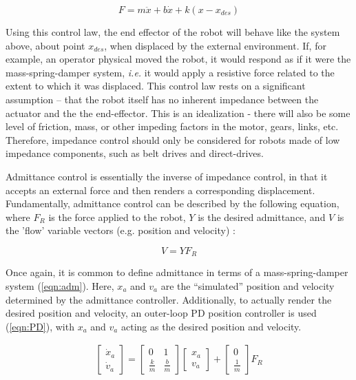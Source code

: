 \documentclass[12pt]{report}
\begin{document}
\begin{equation}
	F = m\ddot{x} + b\dot{x} + k(x - x_{des})
\end{equation} 

Using this control law, the end effector of the robot will behave like the system above, about point $x_{des}$, when displaced by the external environment. If, for example, an operator physical moved the robot, it would respond as if it were the mass-spring-damper system, \textit{i.e.} it would apply a resistive force related to the extent to which it was displaced. 
	This control law rests on a significant assumption -- that the robot itself has no inherent impedance between the actuator and the the end-effector. This is an idealization - there will also be some level of friction, mass, or other impeding factors in the motor, gears, links, etc. Therefore, impedance control should only be considered for robots made of low impedance components, such as belt drives and direct-drives. 
	
	Admittance control is essentially the inverse of impedance control, in that it accepts an external force and then renders a corresponding displacement. Fundamentally, admittance control can be described by the following equation, where $F_R$ is the force applied to the robot, $Y$ is the desired admittance, and $V$ is the 'flow' variable vectors (e.g. position and velocity) :
	
	\begin{equation}
	V = YF_R 
	\end{equation} 
	
	Once again, it is common to define admittance in terms of a mass-spring-damper system (\ref{eqn:adm}). Here, $x_a$ and $v_a$ are the ``simulated'' position and velocity determined by the admittance controller. Additionally, to actually render the desired position and velocity, an outer-loop PD position controller is used (\ref{eqn:PD}), with $x_a$ and $v_a$ acting as the desired position and velocity. 
	
	\begin{gather} \label{eqn:adm}
	\begin{bmatrix}
    	\dot{x}_a \\
    	\dot{v}_a 
    \end{bmatrix} 
    =
    \begin{bmatrix}
    	0 & 1 \\
    	\frac{k}{m} & \frac{b}{m}
    \end{bmatrix} 
    \begin{bmatrix}
    	x_a \\
    	v_a
    \end{bmatrix}  
    +
    \begin{bmatrix}
    	0 \\
    	\frac{1}{m}
    \end{bmatrix}
    F_R   	
	\end{gather}
	
\end{document}
